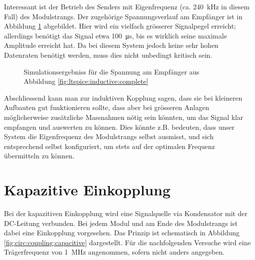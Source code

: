 Interessant    ist    der    Betrieb    des    Senders    mit    Eigenfrequenz
(ca. \SI{240}{\kilo\hertz} in diesem  Fall) des Modulstrangs\footnotemark. Der
zugeh\"orige    Spannungsverlauf    am    Empf\"anger   ist    in    Abbildung
\ref{fig:simu:inductive:resonance}   abgebildet. Hier    wird   ein   vielfach
gr\"osserer  Signalpegel  erreicht;  allerdings  ben\"otigt  das  Signal  etwa
\SI{100}{\micro\second},  bis  es wirklich  seine maximale  Amplitude erreicht
hat. Da  bei  diesem System  jedoch  keine  sehr hohen  Datenraten  ben\"otigt
werden, muss dies nicht unbedingt kritisch sein.


\begin{figure}[h!tb]
    
    \caption{%
        Simulationsergebniss f\"ur die Spannung am Empf\"anger aus Abbildung
        \ref{fig:ltspice:inductive:complete}%
    }
    \label{fig:simu:inductive:resonance}
\end{figure}


Abschliessend kann man  zur induktiven Kopplung sagen, dass  sie bei kleineren
Aufbauten  gut  funktionieren  sollte,   dass  aber  bei  gr\"osseren  Anlagen
m\"oglicherweise  zus\"atzliche  Massnahmen  n\"otig sein  k\"onnten,  um  das
Signal klar empfangen und auswerten  zu k\"onnen. Dies k\"onnte z.B. bedeuten,
dass  unser System  die Eigenfrequenz  des Modulstrangs  selbst ausmisst,  und
sich entsprechend  selbst konfiguriert,  um stets  auf der  optimalen Frequenz
\"ubermitteln zu k\"onnen.


\clearpage
\section{Kapazitive Einkopplung}
\label{sec:simu:coupling:capacitive}

Bei der  kapazitiven Einkopplung  wird eine  Signalquelle via  Kondensator mit
der  DC-Leitung  verbunden. Bei  jedem  Modul und  am  Ende  des  Modulstrangs
ist   dabei  eine   Einkopplung   vorgesehen. Das   Prinzip  ist   schematisch
in   Abbildung   \ref{fig:circ:coupling:capacitive}   dargestellt. F\"ur   die
nachfolgenden  Versuche  wird  eine Tr\"agerfrequenz  von  \SI{1}{\mega\hertz}
angenommen, sofern nicht anders angegeben.

